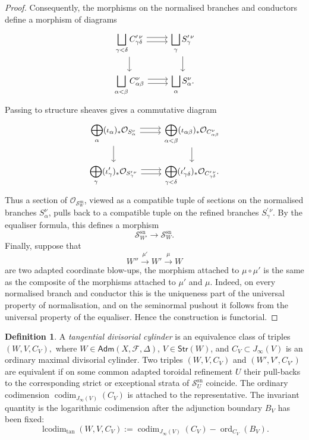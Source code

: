 \documentclass[11pt]{amsart}
\numberwithin{equation}{section}
\theoremstyle{plain}
\theoremstyle{definition}
\newtheorem{Definition}[Theorem]{Definition}
\newcommand{\codim}{\operatorname{codim}}
\newcommand{\ord}{\operatorname{ord}}
\newcommand{\lcodim}{\operatorname{lcodim}}
\newcommand{\sn}{\mathrm{sn}}
\newcommand{\Adm}{\mathsf{Adm}}
\newcommand{\Strata}{\mathsf{Str}}
\newcommand{\cF}{\mathcal F}
\newcommand{\sS}{\mathscr S}
\begin{document}
\begin{proof}
Consequently, the morphisms on the normalised branches and conductors define a
morphism of diagrams
\[
\begin{tikzcd}
\displaystyle\bigsqcup_{\gamma<\delta} C_{\gamma\delta}^{\prime\,\nu}
\arrow[r,shift left=.6ex] \arrow[r,shift right=.6ex] \arrow[d] &
\displaystyle\bigsqcup_{\gamma} S_\gamma^{\prime\,\nu}
\arrow[d]\\
\displaystyle\bigsqcup_{\alpha<\beta} C_{\alpha\beta}^{\nu}
\arrow[r,shift left=.6ex] \arrow[r,shift right=.6ex] &
\displaystyle\bigsqcup_{\alpha} S_\alpha^\nu.
\end{tikzcd}
\]
Passing to structure sheaves gives a commutative diagram
\[
\begin{tikzcd}
\displaystyle
\bigoplus_\alpha(\iota_\alpha)_*\mathcal O_{S_\alpha^\nu}
\arrow[r,shift left=.6ex] \arrow[r,shift right=.6ex] \arrow[d] &
\displaystyle
\bigoplus_{\alpha<\beta}
(\iota_{\alpha\beta})_*\mathcal O_{C_{\alpha\beta}^\nu}
\arrow[d]\\
\displaystyle
\bigoplus_\gamma(\iota'_\gamma)_*
\mathcal O_{S_\gamma^{\prime\,\nu}}
\arrow[r,shift left=.6ex] \arrow[r,shift right=.6ex] &
\displaystyle
\bigoplus_{\gamma<\delta}
(\iota'_{\gamma\delta})_*
\mathcal O_{C_{\gamma\delta}^{\prime\,\nu}}.
\end{tikzcd}
\]
Thus a section of
\(\mathcal O_{\mathscr S_W^{\sn}}\), viewed as a compatible tuple of
sections on the normalised branches \(S_\alpha^\nu\), pulls back to a
compatible tuple on the refined branches \(S_\gamma^{\prime\,\nu}\).
By the equaliser formula, this defines a morphism
\[
\mathscr S_{W'}^{\sn}\longrightarrow \mathscr S_W^{\sn}.
\]
Finally, suppose that
\[
W''\xrightarrow{\mu'} W'\xrightarrow{\mu} W
\]
are two adapted coordinate blow-ups, the morphism attached to
\(\mu\circ\mu'\) is the same as the composite of the morphisms attached to
\(\mu'\) and \(\mu\). Indeed, on every normalised branch and conductor this
is the uniqueness part of the universal property of normalisation, and on
the seminormal pushout it follows from the universal property of the
equaliser. Hence the construction is functorial.
\end{proof}

\begin{Definition}
\label{def:tangential-cylinder-operational}
A \emph{tangential divisorial cylinder} is an equivalence class of triples
$
(W,V,C_V),
$
where $W\in\Adm(X,\cF,\Delta)$, $V\in\Strata(W)$, and $C_V\subset J_\infty(V)$ is an ordinary maximal divisorial cylinder.  Two triples $(W,V,C_V)$ and $(W',V',C_{V'})$ are equivalent if on some common adapted toroidal refinement $U$ their pull-backs to the corresponding strict or exceptional strata of $\sS_U^{\sn}$ coincide.
The ordinary codimension $\codim_{J_\infty(V)}(C_V)$ is attached to the representative.  The invariant quantity is the logarithmic codimension after the adjunction boundary $B_V$ has been fixed:
\[
\lcodim_{\tan}(W,V,C_V):=\codim_{J_\infty(V)}(C_V)-\ord_{C_V}(B_V).
\]
\end{Definition}
\end{document}
